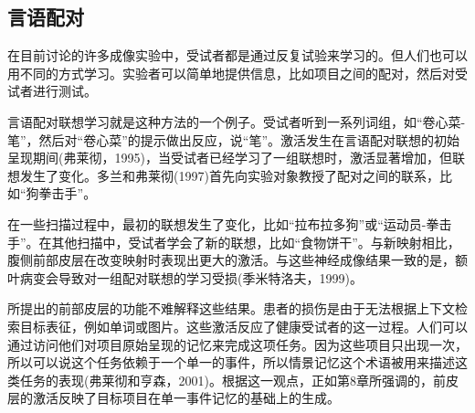 \subsection{言语配对}
\par
在目前讨论的许多成像实验中，受试者都是通过反复试验来学习的。但人们也可以用不同的方式学习。实验者可以简单地提供信息，比如项目之间的配对，然后对受试者进行测试。
\par
言语配对联想学习就是这种方法的一个例子。受试者听到一系列词组，如“卷心菜-笔”，然后对“卷心菜”的提示做出反应，说“笔”。激活发生在言语配对联想的初始呈现期间(弗莱彻，1995)，当受试者已经学习了一组联想时，激活显著增加，但联想发生了变化。多兰和弗莱彻(1997)首先向实验对象教授了配对之间的联系，比如“狗拳击手”。
\par
在一些扫描过程中，最初的联想发生了变化，比如“拉布拉多狗”或“运动员-拳击手”。在其他扫描中，受试者学会了新的联想，比如“食物饼干”。与新映射相比，腹侧前部皮层在改变映射时表现出更大的激活。与这些神经成像结果一致的是，额叶病变会导致对一组配对联想的学习受损(季米特洛夫，1999)。
\par
所提出的前部皮层的功能不难解释这些结果。患者的损伤是由于无法根据上下文检索目标表征，例如单词或图片。这些激活反应了健康受试者的这一过程。人们可以通过访问他们对项目原始呈现的记忆来完成这项任务。因为这些项目只出现一次，所以可以说这个任务依赖于一个单一的事件，所以情景记忆这个术语被用来描述这类任务的表现(弗莱彻和亨森，2001)。根据这一观点，正如第8章所强调的，前皮层的激活反映了目标项目在单一事件记忆的基础上的生成。
\par

